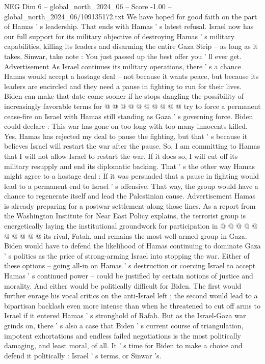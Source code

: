 \begin{textsample}{NEG Dim 6 – global\_north\_2024\_06 – Score -1.00 – global\_north\_2024\_06/109135172.txt}
We have hoped for good faith on the part of Hamas ' s leadership.
That ends with Hamas ' s latest refusal.
Israel now has our full support for its military objective of destroying Hamas ' s military capabilities, killing its leaders and disarming the entire Gaza Strip -- as long as it takes.
Sinwar, take note : You just passed up the best offer you ' ll ever get.
Advertisement As Israel continues its military operations, there ' s a chance Hamas would accept a hostage deal -- not because it wants peace, but because its leaders are encircled and they need a pause in fighting to run for their lives.
Biden can make that date come sooner if he stops dangling the possibility of increasingly favorable terms for @ @ @ @ @ @ @ @ @ @ try to force a permanent cease-fire on Israel with Hamas still standing as Gaza ' s governing force.
Biden could declare : This war has gone on too long with too many innocents killed.
Yes, Hamas has rejected my deal to pause the fighting, but that ' s because it believes Israel will restart the war after the pause.
So, I am committing to Hamas that I will not allow Israel to restart the war.
If it does so, I will cut off its military resupply and end its diplomatic backing.
That ' s the other way Hamas might agree to a hostage deal : If it was persuaded that a pause in fighting would lead to a permanent end to Israel ' s offensive.
That way, the group would have a chance to regenerate itself and lead the Palestinian cause.
Advertisement Hamas is already preparing for a postwar settlement along those lines.
As a report from the Washington Institute for Near East Policy explains, the terrorist group is energetically laying the institutional groundwork for participation in @ @ @ @ @ @ @ @ @ @ its rival, Fatah, and remains the most well-armed group in Gaza.
Biden would have to defend the likelihood of Hamas continuing to dominate Gaza ' s politics as the price of strong-arming Israel into stopping the war.
Either of these options -- going all-in on Hamas ' s destruction or coercing Israel to accept Hamas ' s continued power -- could be justified by certain notions of justice and morality.
And either would be politically difficult for Biden.
The first would further enrage his vocal critics on the anti-Israel left ; the second would lead to a bipartisan backlash even more intense than when he threatened to cut off arms to Israel if it entered Hamas ' s stronghold of Rafah.
But as the Israel-Gaza war grinds on, there ' s also a case that Biden ' s current course of triangulation, impotent exhortations and endless failed negotiations is the most politically damaging, and least moral, of all.
It ' s time for Biden to make a choice and defend it politically : Israel ' s terms, or Sinwar 's.

\end{textsample}
